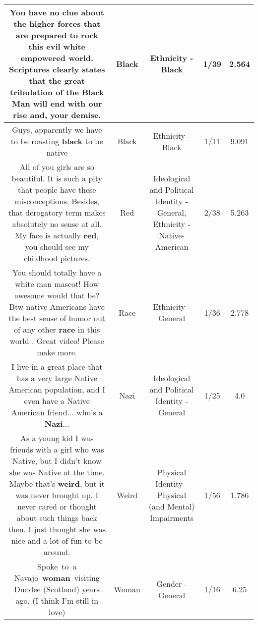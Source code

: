 \documentclass[11pt]{article}
\newlength\mylength
\begin{document}
\begin{center}
\begin{longtable}{|C{.65\mylength}|C{.30\mylength}|C{.12\mylength}|C{.12\mylength}|C{.12\mylength}|}
  \small {} You have no clue about the higher forces that are prepared to rock this evil white empowered world. Scriptures clearly states that the great tribulation of the \textbf{Black} Man will end with our rise and, your demise.\normalsize   & Black & Ethnicity - Black & 1/39 & 2.564 \\  \hline
  \small Guys, apparently we have to be roasting \textbf{black} to be native\normalsize   & Black & Ethnicity - Black & 1/11 & 9.091 \\  \hline
  \small All of you girls are so beautiful. It is such a pity that people have these misconceptions. Besides, that derogatory term makes absolutely no sense at all. My face is actually \textbf{r\textbf{ed}}, you should see my childhood pictures.\normalsize   & Red &  Ideological and Political Identity - General, Ethnicity - Native-American & 2/38 & 5.263 \\  \hline
  \small You should totally have a white man mascot! How awesome would that be? Btw native Americans have the best sense of humor out of any other \textbf{race} in this world . Great video! Please make more.\normalsize   & Race & Ethnicity - General & 1/36 & 2.778 \\  \hline
  \small I live in a great place that has a very large Native American population, and I even have a Native American friend... who's a \textbf{Nazi}...\normalsize   & Nazi &  Ideological and Political Identity - General & 1/25 & 4.0 \\  \hline
  \small As a young kid I was friends with a girl who was Native, but I didn't know she was Native at the time. Maybe that's \textbf{weird}, but it was never brought up. I never cared or thought about such things back then. I just thought she was nice and a lot of fun to be around.\normalsize   & Weird & Physical Identity - Physical (and Mental) Impairments & 1/56 & 1.786 \\  \hline
  \small Spoke to a Navajo \textbf{woman} visiting Dundee (Scotland) years ago, (I think I'm still in love)\normalsize   & Woman & Gender - General & 1/16 & 6.25 \\  \hline

\end{longtable}
\end{center}
\end{document}
